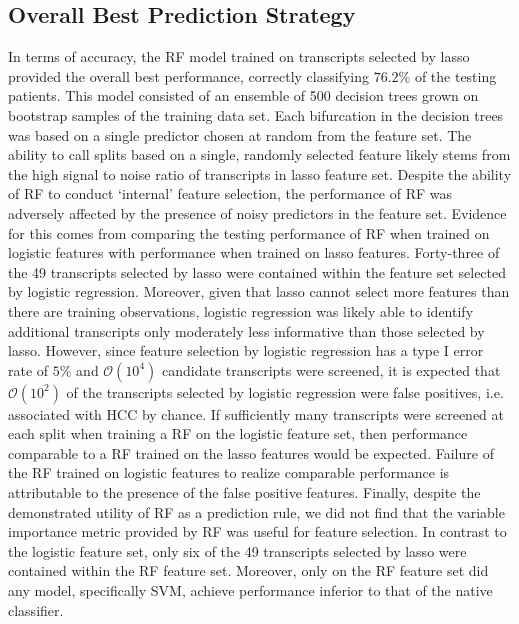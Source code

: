 \documentclass[a4paper]{article}
\begin{document}
\subsection{Overall Best Prediction Strategy}

In terms of accuracy, the RF model trained on transcripts selected by lasso provided the overall best performance, correctly classifying $76.2\%$ of the testing patients. This model consisted of an ensemble of 500 decision trees grown on bootstrap samples of the training data set. Each bifurcation in the decision trees was based on a single predictor chosen at random from the feature set. The ability to call splits based on a single, randomly selected feature likely stems from the high signal to noise ratio of transcripts in lasso feature set. Despite the ability of RF to conduct `internal' feature selection, the performance of RF was adversely affected by the presence of noisy predictors in the feature set. Evidence for this comes from comparing the testing performance of RF when trained on logistic features with performance when trained on lasso features. Forty-three of the 49 transcripts selected by lasso were contained within the feature set selected by logistic regression. Moreover, given that lasso cannot select more features than there are training observations, logistic regression was likely able to identify additional transcripts only moderately less informative than those selected by lasso. However, since feature selection by logistic regression has a type I error rate of $5\%$ and $\mathcal{O}(10^4)$ candidate transcripts were screened, it is expected that $\mathcal{O}(10^2)$ of the transcripts selected by logistic regression were false positives, i.e. associated with HCC by chance. If sufficiently many transcripts were screened at each split when training a RF on the logistic feature set, then performance comparable to a RF trained on the lasso features would be expected. Failure of the RF trained on logistic features to realize comparable performance is attributable to the presence of the false positive features. Finally, despite the demonstrated utility of RF as a prediction rule, we did not find that the variable importance metric provided by RF was useful for feature selection. In contrast to the logistic feature set, only six of the 49 transcripts selected by lasso were contained within the RF feature set. Moreover, only on the RF feature set did any model, specifically SVM, achieve performance inferior to that of the native classifier. \cite{suzuki2008dna}
\end{document}
